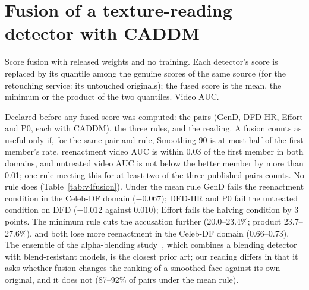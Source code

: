 \documentclass[10pt]{article}
\begin{document}
\section{Fusion of a texture-reading detector with CADDM}
\label{sec:fusion}
\begin{table}[H]
\centering
\caption{Score fusion with released weights and no training. Each detector's score is replaced by its quantile among the genuine
scores of the same source (for the retouching service: its untouched originals); the fused score is the mean, the minimum or the
product of the two quantiles. Video AUC.}
\label{tab:v4fusion}
\scriptsize
\begin{adjustbox}{max width=\linewidth}\end{adjustbox}
\end{table}
Declared before any fused score was computed: the pairs (GenD, DFD-HR, Effort and P0, each with CADDM), the three rules, and the
reading. A fusion counts as useful only if, for the same pair and rule, Smoothing-90 is at most half of the first member's rate,
reenactment video AUC is within 0.03 of the first member in both domains, and untreated video AUC is not below the better member by
more than 0.01; one rule meeting this for at least two of the three published pairs counts. No rule does (Table~\ref{tab:v4fusion}).
Under the mean rule GenD fails the reenactment condition in the Celeb-DF domain ($-0.067$); DFD-HR and P0 fail the untreated
condition on DFD ($-0.012$ against 0.010); Effort fails the halving condition by 3 points. The minimum rule cuts the accusation
further (20.0--23.4\%; product 23.7--27.6\%), and both lose more reenactment in the Celeb-DF domain (0.66--0.73). The ensemble of
the alpha-blending study~\cite{alphablend2026}, which combines a blending detector with blend-resistant models, is the closest prior
art; our reading differs in that it asks whether fusion changes the ranking of a smoothed face against its own original, and it does
not (87--92\% of pairs under the mean rule).
\end{document}
